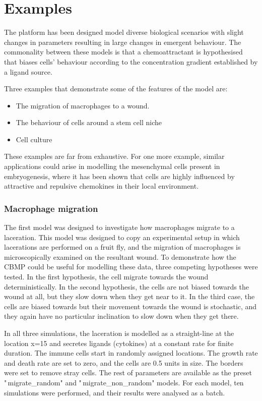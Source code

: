 \documentclass[12pt]{article}
\begin{document}
\section{Examples}
The platform has been designed model diverse biological scenarios with 
slight changes in parameters resulting in large changes in emergent 
behaviour. The commonality between these models is that a 
chemoattractant is hypothesised that biases cells' behaviour according 
to the concentration gradient established by a ligand source.

Three examples that demonstrate some of the features of the model are:

\begin{itemize}
\item The migration of macrophages to a wound.
\item The behaviour of cells around a stem cell niche
\item Cell culture
\end{itemize}

These examples are far from exhaustive. For one more example, similar 
applications could arise in modelling the mesenchymal cells present in 
embryogenesis, where it has been shown that cells are highly influenced 
by attractive and repulsive chemokines in their local environment.

\subsubsection{Macrophage migration}
The first model was designed to investigate how macrophages migrate to a 
laceration. This model was designed to copy an experimental setup in 
which lacerations are performed on a fruit fly, and the migration of 
macrophages is microscopically examined on the resultant wound. To 
demonstrate how the CBMP could be useful for modelling these data, three 
competing hypotheses were tested. In the first hypothesis, the cell 
migrate towards the wound deterministically. In the second hypothesis, 
the cells are not biased towards the wound at all, but they slow down 
when they get near to it. In the third case, the cells are biased 
towards but their movement towards the wound is stochastic, and they 
again have no particular inclination to slow down when they get there.

In all three simulations, the laceration is modelled as a straight-line 
at the location x=15 and secretes ligands (cytokines) at a constant rate 
for finite duration. The immune cells start in randomly assigned 
locations. The growth rate and death rate are set to zero, and the cells 
are 0.5 units in size. The borders were set to remove stray cells. The 
rest of parameters are available as the preset "\,migrate\_random" and 
"\,migrate\_non\_random" models. For each model, ten simulations were 
performed, and their results were analysed as a batch.
\end{document}
